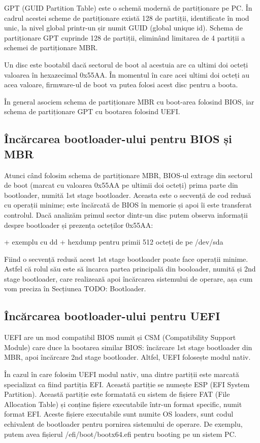 GPT (GUID Partition Table) este o schemă modernă de partiționare pe PC. În
cadrul acestei scheme de partiționare există 128 de partiții, identificate în
mod unic, la nivel global printr-un șir numit GUID (global unique id). Schema de
partiționare GPT cuprinde 128 de partiții, eliminând limitarea de 4 partiții a
schemei de partiționare MBR.

Un disc este bootabil dacă sectorul de boot al acestuia are ca ultimi doi octeți
valoarea în hexazecimal 0x55AA. În momentul în care acei ultimi doi octeți au
acea valoare, firmware-ul de boot va putea folosi acest disc pentru a boota.

În general asociem schema de partiționare MBR cu boot-area folosind BIOS, iar
schema de partiționare GPT cu bootarea folosind UEFI.

\subsection{Încărcarea bootloader-ului pentru BIOS și MBR}
\label{sec:boot-bootdev-bootmbr}

Atunci când folosim schema de partiționare MBR, BIOS-ul extrage din sectorul de
boot (marcat cu valoarea 0x55AA pe ultimii doi octeți) prima parte din
bootloader, numită 1st stage bootloader. Aceasta este o secvență de cod redusă
cu operații minime; este încărcată de BIOS în memorie și apoi îi este transferat
controlul. Dacă analizăm primul sector dintr-un disc putem observa informații
despre bootloader și prezența octeților 0x55AA:

+ exemplu cu dd + hexdump pentru primii 512 octeți de pe /dev/sda

Fiind o secvență redusă acest 1st stage bootloader poate face operații minime.
Astfel că rolul său este să încarca partea principală din booloader, numită și
2nd stage bootloader, care realizează apoi încărcarea sistemului de operare, așa
cum vom preciza în Secțiunea TODO: Bootloader.

\subsection{Încărcarea bootloader-ului pentru UEFI}
\label{sec:boot-bootdev-bootuefi}

UEFI are un mod compatibil BIOS numit și CSM (Compatibility Support Module) care
duce la bootarea similar BIOS: încărcare 1st stage bootloader din MBR, apoi
încărcare 2nd stage bootloader. Altfel, UEFI folosește modul nativ.

În cazul în care folosim UEFI modul nativ, una dintre partiții este marcată
specializat ca fiind partiția EFI. Această partiție se numește ESP (EFI System
Partition). Această partiție este formatată cu sistem de fișiere FAT (File
Allocation Table) și conține fișiere executabile într-un format specific, numit
format EFI. Aceste fișiere executabile sunt numite OS loaders, sunt codul
echivalent de bootloader pentru pornirea sistemului de operare. De exemplu,
putem avea fișierul /efi/boot/bootx64.efi pentru booting pe un sistem PC.


